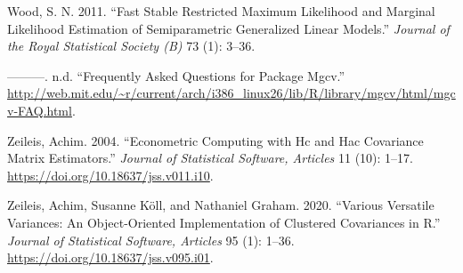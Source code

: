 \documentclass{article}
\begin{document}
\leavevmode\hypertarget{ref-mgcv}{}%
Wood, S. N. 2011. ``Fast Stable Restricted Maximum Likelihood and Marginal Likelihood Estimation of Semiparametric Generalized Linear Models.'' \emph{Journal of the Royal Statistical Society (B)} 73 (1): 3--36.

\leavevmode\hypertarget{ref-wood}{}%
---------. n.d. ``Frequently Asked Questions for Package Mgcv.'' \url{http://web.mit.edu/~r/current/arch/i386_linux26/lib/R/library/mgcv/html/mgcv-FAQ.html}.

\leavevmode\hypertarget{ref-JSSv011i10}{}%
Zeileis, Achim. 2004. ``Econometric Computing with Hc and Hac Covariance Matrix Estimators.'' \emph{Journal of Statistical Software, Articles} 11 (10): 1--17. \url{https://doi.org/10.18637/jss.v011.i10}.

\leavevmode\hypertarget{ref-JSSv095i01}{}%
Zeileis, Achim, Susanne Köll, and Nathaniel Graham. 2020. ``Various Versatile Variances: An Object-Oriented Implementation of Clustered Covariances in R.'' \emph{Journal of Statistical Software, Articles} 95 (1): 1--36. \url{https://doi.org/10.18637/jss.v095.i01}.



\end{document}
